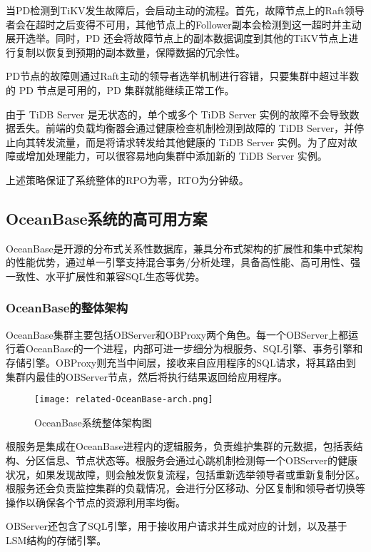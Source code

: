 当PD检测到TiKV发生故障后，会启动主动的\failover 流程。首先，故障节点上的Raft领导者会在超时之后变得不可用，其他节点上的Follower副本会检测到这一超时并主动展开选举。同时，PD 还会将故障节点上的副本数据调度到其他的TiKV节点上进行复制以恢复到预期的副本数量，保障数据的冗余性。

PD节点的故障则通过Raft主动的领导者选举机制进行容错，只要集群中超过半数的 PD 节点是可用的，PD 集群就能继续正常工作。

由于 TiDB Server 是无状态的，单个或多个 TiDB Server 实例的故障不会导致数据丢失。前端的负载均衡器会通过健康检查机制检测到故障的 TiDB Server，并停止向其转发流量，而是将请求转发给其他健康的 TiDB Server 实例。为了应对故障或增加处理能力，可以很容易地向集群中添加新的 TiDB Server 实例。

上述策略保证了系统整体的RPO为零，RTO为分钟级。


\subsection{OceanBase系统的高可用方案}

OceanBase是开源的分布式关系性数据库，兼具分布式架构的扩展性和集中式架构的性能优势，通过单一引擎支持混合事务/分析处理，具备高性能、高可用性、强一致性、水平扩展性和兼容SQL生态等优势。

\subsubsection{OceanBase的整体架构}

OceanBase集群主要包括OBServer和OBProxy两个角色。每一个OBServer上都运行着OceanBase的一个进程，内部可进一步细分为根服务、SQL引擎、事务引擎和存储引擎。OBProxy则充当中间层，接收来自应用程序的SQL请求，将其路由到集群内最佳的OBServer节点，然后将执行结果返回给应用程序。

\begin{figure}
  \centering
  \texttt{[image: related-OceanBase-arch.png]}
  \caption{OceanBase系统整体架构图}
  \label{fig:OceanBase-arch}
\end{figure}

根服务是集成在OceanBase进程内的逻辑服务，负责维护集群的元数据，包括表结构、分区信息、节点状态等。根服务会通过心跳机制检测每一个OBServer的健康状况，如果发现故障，则会触发恢复流程，包括重新选举领导者或重新复制分区。根服务还会负责监控集群的负载情况，会进行分区移动、分区复制和领导者切换等操作以确保各个节点的资源利用率均衡。

OBServer还包含了SQL引擎，用于接收用户请求并生成对应的计划，以及基于LSM结构的存储引擎。

